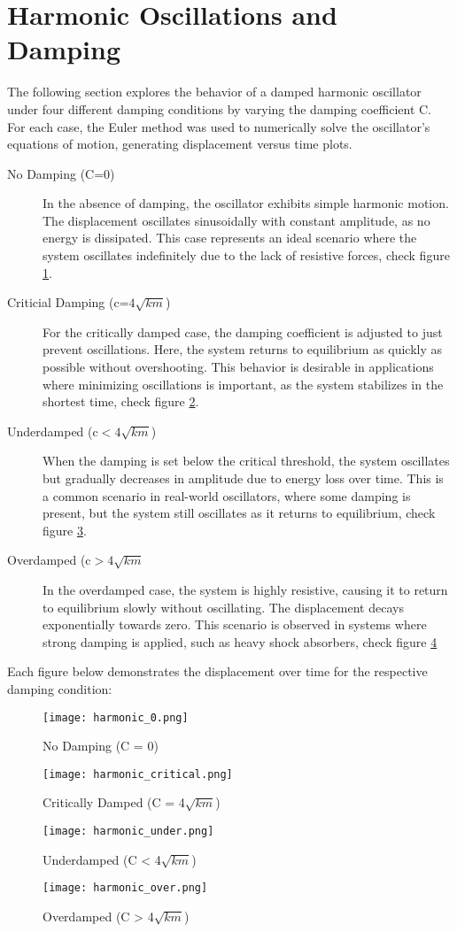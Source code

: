 \documentclass{article}
\begin{document}
\section{Harmonic Oscillations and Damping}
The following section explores the behavior of a damped harmonic oscillator under four different damping conditions by varying the damping coefficient C. For each case, the Euler method was used to numerically solve the oscillator’s equations of motion, generating displacement versus time plots.
\begin{description}
    \item[No Damping (C=0)] In the absence of damping, the oscillator exhibits simple harmonic motion. The displacement oscillates sinusoidally with constant amplitude, as no energy is dissipated. This case represents an ideal scenario where the system oscillates indefinitely due to the lack of resistive forces, check figure \ref{undamped}.
    \item[Criticial Damping (c=$4\sqrt{km}$)] For the critically damped case, the damping coefficient is adjusted to just prevent oscillations. Here, the system returns to equilibrium as quickly as possible without overshooting. This behavior is desirable in applications where minimizing oscillations is important, as the system stabilizes in the shortest time, check figure \ref{critically}.
    \item[Underdamped (c$<4\sqrt{km}$)] When the damping is set below the critical threshold, the system oscillates but gradually decreases in amplitude due to energy loss over time. This is a common scenario in real-world oscillators, where some damping is present, but the system still oscillates as it returns to equilibrium, check figure \ref{under}. 
    \item[Overdamped (c$>4\sqrt{km}$] In the overdamped case, the system is highly resistive, causing it to return to equilibrium slowly without oscillating. The displacement decays exponentially towards zero. This scenario is observed in systems where strong damping is applied, such as heavy shock absorbers, check figure \ref{over}
\end{description}
Each figure below demonstrates the displacement over time for the respective damping condition:
\begin{figure}[h!] 
    \texttt{[image: harmonic\_0.png]} \caption{No Damping (C = 0)}
    \label{undamped}
\end{figure}
 \begin{figure}[h!]  
    \texttt{[image: harmonic\_critical.png]} \caption{Critically Damped (C = 4$\sqrt{km}$)} 
    \label{critically}
\end{figure} 
\begin{figure}[h!] 
    \texttt{[image: harmonic\_under.png]} \caption{Underdamped (C < 4$\sqrt{km}$)} 
    \label{under}
\end{figure} 
\begin{figure}[h!] 
    \texttt{[image: harmonic\_over.png]} \caption{Overdamped (C > 4$\sqrt{km}$)} 
    \label{over}
\end{figure} 
\end{document}
